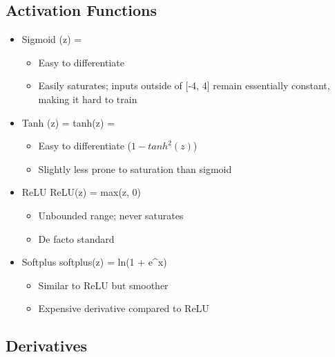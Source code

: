 \documentclass[12pt]{article}
\newenvironment{eqn}{\equation\alignedat{3}}{\endalignedat\endequation}
\begin{document}
\subsection{Activation Functions}

\begin{itemize}
	\item Sigmoid
	\begin{eqn}
		\phi(z) = 
	\end{eqn}
	\begin{itemize}
		\item Easy to differentiate 
		\item Easily saturates; inputs outside of [-4, 4] remain essentially constant, making it hard to train
	\end{itemize}
	\item Tanh 
	\begin{eqn}
		\phi(z) = tanh(z) = 
	\end{eqn}
	\begin{itemize}
		\item Easy to differentiate ($1 - tanh^2(z)$)
		\item Slightly less prone to saturation than sigmoid
	\end{itemize}
	\item ReLU 
	\begin{eqn}
		ReLU(z) = max(z, 0)
	\end{eqn}
	\begin{itemize}
		\item Unbounded range; never saturates 
	\item De facto standard
	\end{itemize}
	\item Softplus
	\begin{eqn}
		softplus(z) = ln(1 + e^x)
	\end{eqn}
	\begin{itemize}
		\item Similar to ReLU but smoother
		\item Expensive derivative compared to ReLU
	\end{itemize}
\end{itemize} 

\subsection{Derivatives}
\end{document}
